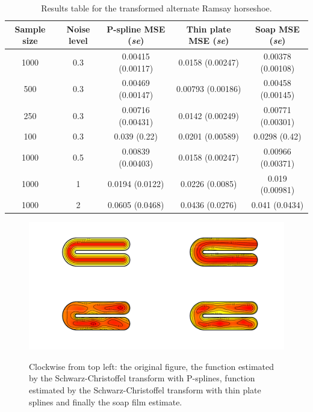 \documentclass[a4paper,10pt]{amsart}
\newcommand{\sch}{Schwarz-Christoffel }
\begin{document}
\begin{table}[ht]
\begin{tabular}{c c c c c}\\
Sample size & Noise level & P-spline MSE (\emph{se}) & Thin plate MSE (\emph{se}) & Soap MSE (\emph{se}) \\
\hline
\hline
1000 & 0.3 & 0.00415 (0.00117) & 0.0158 (0.00247) & 0.00378 (0.00108) \\ 
500 & 0.3 & 0.00469 (0.00147) & 0.00793 (0.00186) & 0.00458 (0.00145) \\ 
250 & 0.3 & 0.00716 (0.00431) & 0.0142 (0.00249) & 0.00771 (0.00301) \\ 
100 & 0.3 & 0.039 (0.22) & 0.0201 (0.00589) & 0.0298 (0.42) \\ 
1000 & 0.5 & 0.00839 (0.00403) & 0.0158 (0.00247) & 0.00966 (0.00371) \\ 
1000 & 1 & 0.0194 (0.0122) & 0.0226 (0.0085) & 0.019 (0.00981) \\ 
1000 & 2 & 0.0605 (0.0468) & 0.0436 (0.0276) & 0.041 (0.0434) \\ 
\end{tabular}
\label{altramsayresultstable}
\caption{Results table for the transformed alternate Ramsay horseshoe.}
\end{table}

\begin{figure}
\centering
\includegraphics[width=5in, trim=0in 0in 0in 0in]{figs/altramsaycomp.pdf}\\
\caption{Clockwise from top left: the original figure, the function estimated by the \sch transform with P-splines, function estimated by the \sch transform with thin plate splines and finally the soap film estimate.}
\label{altramsaycomp}
\end{figure}
\end{document}
